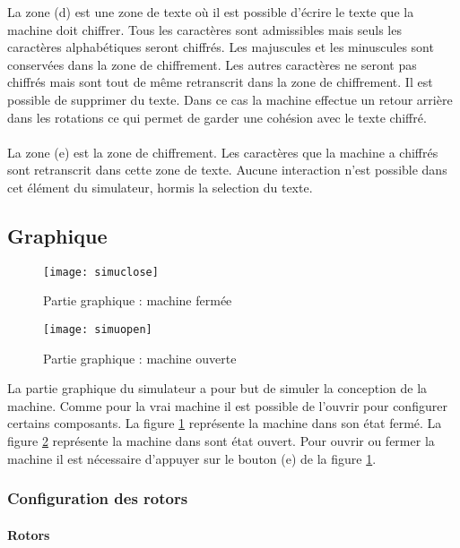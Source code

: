 \documentclass[letterpaper]{article}
\begin{document}
La zone (d) est une zone de texte où il est possible d'écrire le texte que la machine doit chiffrer. Tous les caractères sont admissibles mais seuls les caractères alphabétiques seront chiffrés. Les majuscules et les minuscules sont conservées dans la zone de chiffrement. Les autres caractères ne seront pas chiffrés mais sont tout de même retranscrit dans la zone de chiffrement. Il est possible de supprimer du texte. Dans ce cas la machine effectue un retour arrière dans les rotations ce qui permet de garder une cohésion avec le texte chiffré.

\paragraph{}

La zone (e) est la zone de chiffrement. Les caractères que la machine a chiffrés sont retranscrit dans cette zone de texte. Aucune interaction n'est possible dans cet élément du simulateur, hormis la selection du texte.

\subsection{Graphique}

\begin{figure}
    \centering
    \texttt{[image: simuclose]}
    \caption{Partie graphique : machine fermée}
    \label{fig:simuclose}
\end{figure}

\begin{figure}
    \centering
    \texttt{[image: simuopen]}
    \caption{Partie graphique : machine ouverte}
    \label{fig:simuopen}
\end{figure}

La partie graphique du simulateur a pour but de simuler la conception de la machine. Comme pour la vrai machine il est possible de l'ouvrir pour configurer certains composants. La figure \ref{fig:simuclose} représente la machine dans son état fermé. La figure \ref{fig:simuopen} représente la machine dans sont état ouvert. Pour ouvrir ou fermer la machine il est nécessaire d'appuyer sur le bouton (e) de la figure \ref{fig:simuclose}.

\subsubsection{Configuration des rotors}

\paragraph{Rotors}
\end{document}
